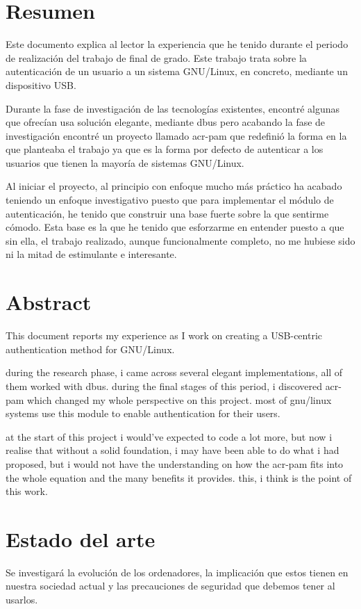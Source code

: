 \documentclass[twoside, titlepage, 12pt, a4paper]{article}
\let\oldsection\section
\def\section{\cleardoublepage\oldsection}
\begin{document}
\section*{Resumen}
Este documento explica al lector la experiencia que he tenido durante el periodo de realización del trabajo de final de grado. Este trabajo trata sobre la autenticación de un usuario a un sistema \gls{GNU/Linux}, en concreto, mediante un dispositivo \gls{USB}.\par 
Durante la fase de investigación de las tecnologías existentes, encontré algunas que ofrecían usa solución elegante, mediante \gls{dbus} pero acabando la fase de investigación encontré un proyecto llamado \gls{acr-pam} que redefinió la forma en la que planteaba el trabajo ya que es la forma por defecto de autenticar a los usuarios que tienen la mayoría de sistemas \gls{GNU/Linux}.\par 
Al iniciar el proyecto, al principio con enfoque mucho más práctico ha acabado teniendo un enfoque investigativo puesto que para implementar el módulo de autenticación, he tenido que construir una base fuerte sobre la que sentirme cómodo. Esta base es la que he tenido que esforzarme en entender puesto a que sin ella, el trabajo realizado, aunque funcionalmente completo, no me hubiese sido ni la mitad de estimulante e interesante.
\clearpage
\section*{Abstract}
This document reports my experience as I work on creating a USB-centric authentication method for \gls{GNU/Linux}. \par
during the research phase, i came across several elegant implementations, all of them worked with \gls{dbus}. during the final stages of this period, i discovered \gls{acr-pam} which changed my whole perspective on this project. most of \gls{gnu/linux} systems use this module to enable authentication for their users.\par
at the start of this project i would've expected to code a lot more, but now i realise that without a solid foundation, i may have been able to do what i had proposed, but i would not have the understanding on how the \gls{acr-pam} fits into the whole equation and the many benefits it provides. this, i think is the point of this work.
\clearpage

\tableofcontents
\clearpage
\listoffigures
\clearpage
{}
\section{Estado del arte}
Se investigará la evolución de los ordenadores, la implicación que estos tienen en nuestra sociedad actual y las precauciones de seguridad que debemos tener al usarlos.
\end{document}
